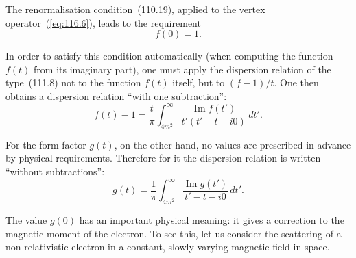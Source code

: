 The renormalisation condition~(110.19), applied to the vertex operator~(\ref{eq:116.6}), leads to the requirement
\begin{equation}
f(0) = 1.
\label{eq:116.10}
\end{equation}


In order to satisfy this condition automatically (when computing the function $f(t)$ from its imaginary part), one must apply the dispersion relation of the type~(111.8) not to the function $f(t)$ itself, but to $(f - 1)/t$. One then obtains a dispersion relation ``with one subtraction'':
\begin{equation}
f(t) - 1 = \frac{t}{\pi}\int_{4m^2}^{\infty} \frac{\operatorname{Im} f(t')}{t'(t' - t - i0)}\,dt'.
\label{eq:116.11}
\end{equation}

For the form factor $g(t)$, on the other hand, no values are prescribed in advance by physical requirements. Therefore for it the dispersion relation is written ``without subtractions'':
\begin{equation}
g(t) = \frac{1}{\pi}\int_{4m^2}^{\infty} \frac{\operatorname{Im} g(t')}{t' - t - i0}\,dt'.
\label{eq:116.12}
\end{equation}

The value $g(0)$ has an important physical meaning: it gives a correction to the magnetic moment of the electron. To see this, let us consider the scattering of a non-relativistic electron in a constant, slowly varying magnetic field in space.

